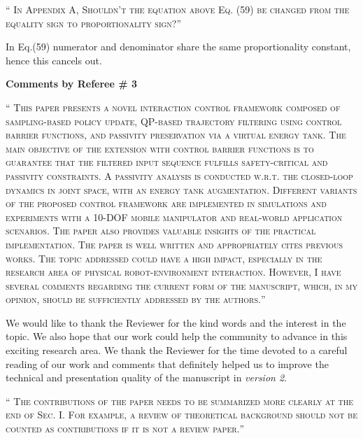 \documentclass[10pt]{article}
\newcommand{\referee}[1]{\;
  \begin{minipage}[t]{.95\textwidth}
    ``{\small\color{red} \textsc{#1}}''
  \end{minipage}\medskip
  }
\newcommand{\version}[1]{\textit{version #1}}
\begin{document}
\begin{enumerate}[label={[R2:\,\arabic{enumi}]}]
\item\label{reply:R2:22} 
\referee{In Appendix A, Shouldn't the equation above Eq. (59) be changed from the equality sign to proportionality sign?}

In Eq.(59) numerator and denominator share the same proportionality constant, hence this cancels out.

\end{enumerate}

\clearpage
\bigskip
\hspace*{-25pt} \textbf{\large Comments by Referee \# 3}

\begin{enumerate}[label={[R3:\,\arabic{enumi}]}]

\item\label{reply:R3:0}
\referee{This paper presents a novel interaction control framework composed of sampling-based policy update, QP-based trajectory filtering using control barrier functions, and passivity preservation via a virtual energy tank. The main objective of the extension with control barrier functions is to guarantee that the filtered input sequence fulfills safety-critical and passivity constraints. A passivity analysis is conducted w.r.t. the closed-loop dynamics in joint space, with an energy tank augmentation. Different variants of the proposed control framework are implemented in simulations and experiments with a 10-DOF mobile manipulator and real-world application scenarios. The paper also provides valuable insights of the practical implementation. The paper
is well written and appropriately cites previous works. The topic addressed could have a high impact, especially in the research area of physical robot-environment interaction. However, I have several comments regarding the current form of the manuscript, which, in my opinion, should be sufficiently addressed by the authors.}

We would like to thank the Reviewer for the kind words and the interest in the topic. We also hope that our work could help the community to advance in this exciting research area. We thank the Reviewer for the time devoted to a careful reading of our work and comments that definitely helped us to improve the technical and presentation quality of the manuscript in \version{2}.

\item\label{reply:R3:1} 
\referee{The contributions of the paper needs to be summarized more clearly at the end of Sec. I. For example, a review of theoretical background should not be counted as contributions if it is not a review paper.}


\end{enumerate}
\end{document}
